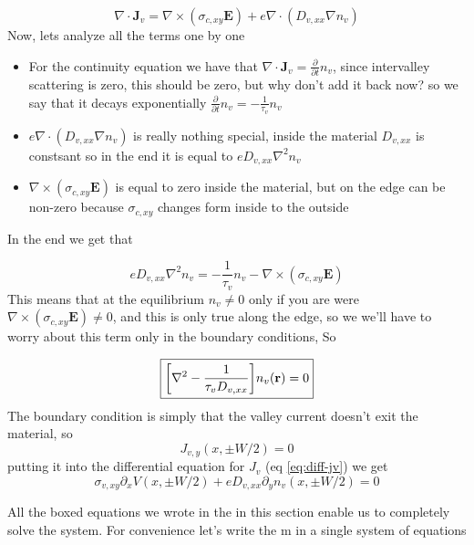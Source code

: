 \begin{equation}
    \nabla \cdot \mathbf J_v=\nabla \times (\sigma_{c,xy} \mathbf E)+ e\nabla \cdot (D_{v,xx}\nabla n_v)
\end{equation}
Now, lets analyze all the terms one by one
\begin{itemize}
\item For the continuity equation we have that $\nabla \cdot \mathbf J_v=\frac \partial {\partial t} n_v$, since intervalley scattering is zero, this should be zero, but  why don't add it back now? so we say that it decays exponentially $\frac \partial {\partial t} n_v=-\frac 1 {\tau_v} n_v$
\item$e\nabla \cdot (D_{v,xx}\nabla n_v)$ is really nothing special, inside the material $D_{v,xx}$ is constsant so in the end it is equal to $eD_{v,xx}\nabla^2 n_v$
\item $\nabla \times (\sigma_{c,xy} \mathbf E)$ is equal to zero inside the material, but on the edge can be non-zero because $\sigma_{c,xy}$ changes form inside to the outside
\end{itemize}
In the end we get that


\begin{equation}
    eD_{v,xx}\nabla^2n_v=-\frac 1{\tau_v}n_v- \nabla \times (\sigma_{c,xy} \mathbf E)
\end{equation}
This means that at the equilibrium $n_v\neq 0$ only if you are were $\nabla\times (\sigma_{c,xy} \mathbf E)\neq 0$, and this is only true along the edge, so we we'll have to worry about this term only in the boundary conditions, So

\begin{equation}
    \boxed{\bigg[
        \nabla^2 -\frac 1{\tau_v D_{v,xx}}
        \bigg]
    n_v(\mathbf{r})=0}
\end{equation}
The boundary condition is simply that the valley current doesn't exit the material, so
\begin{equation}
    J_{v,y}(x,\pm W/2)=0
\end{equation}
putting it into the differential equation for $J_v$ (eq \ref{eq:diff-jv}) we get
\begin{equation}
    \boxed{
        \sigma_{v,xy}\partial_x V(x,\pm W/2)+eD_{v,xx}\partial_y n_v(x,\pm W/2)=0
    }
\end{equation}


All the boxed equations we wrote in the in this section enable us to completely solve the system. For convenience let's write the m in a single system of equations

